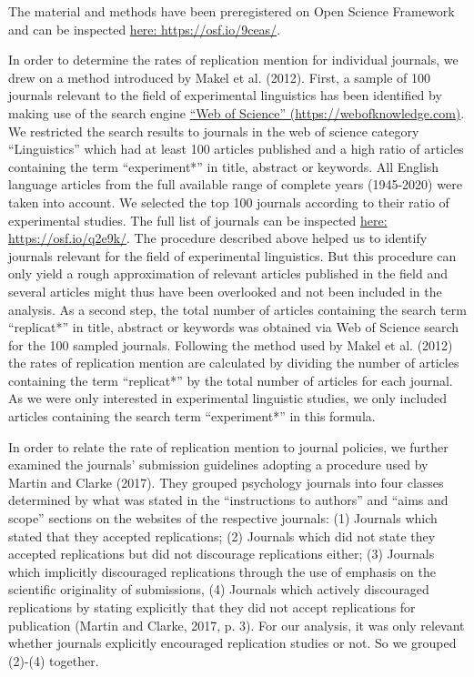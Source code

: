 \documentclass[]{elsarticle} %
\begin{document}
The material and methods have been preregistered on Open Science
Framework and can be inspected \href{https://osf.io/9ceas/}{here:
https://osf.io/9ceas/}.

In order to determine the rates of replication mention for individual
journals, we drew on a method introduced by Makel et al. (2012). First,
a sample of 100 journals relevant to the field of experimental
linguistics has been identified by making use of the search engine
\href{https://webofknowledge.com}{``Web of Science''
(https://webofknowledge.com)}. We restricted the search results to
journals in the web of science category ``Linguistics'' which had at
least 100 articles published and a high ratio of articles containing the
term ``experiment*'' in title, abstract or keywords. All English
language articles from the full available range of complete years
(1945-2020) were taken into account. We selected the top 100 journals
according to their ratio of experimental studies. The full list of
journals can be inspected \href{https://osf.io/q2e9k/}{here:
https://osf.io/q2e9k/}. The procedure described above helped us to
identify journals relevant for the field of experimental linguistics.
But this procedure can only yield a rough approximation of relevant
articles published in the field and several articles might thus have
been overlooked and not been included in the analysis. As a second step,
the total number of articles containing the search term ``replicat*'' in
title, abstract or keywords was obtained via Web of Science search for
the 100 sampled journals. Following the method used by Makel et al.
(2012) the rates of replication mention are calculated by dividing the
number of articles containing the term ``replicat*'' by the total number
of articles for each journal. As we were only interested in experimental
linguistic studies, we only included articles containing the search term
``experiment*'' in this formula.

In order to relate the rate of replication mention to journal policies,
we further examined the journals' submission guidelines adopting a
procedure used by Martin and Clarke (2017). They grouped psychology
journals into four classes determined by what was stated in the
``instructions to authors'' and ``aims and scope'' sections on the
websites of the respective journals: (1) Journals which stated that they
accepted replications; (2) Journals which did not state they accepted
replications but did not discourage replications either; (3) Journals
which implicitly discouraged replications through the use of emphasis on
the scientific originality of submissions, (4) Journals which actively
discouraged replications by stating explicitly that they did not accept
replications for publication (Martin and Clarke, 2017, p. 3). For our
analysis, it was only relevant whether journals explicitly encouraged
replication studies or not. So we grouped (2)-(4) together.
\end{document}
